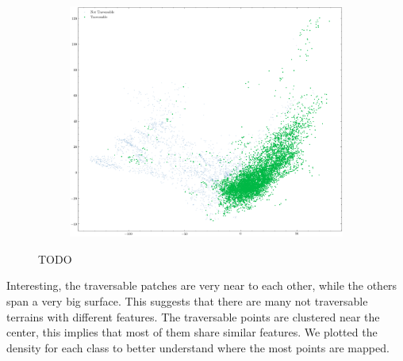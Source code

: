 \documentclass[../document.tex]{subfiles}
\begin{document}
\begin{figure} [htbp]
\begin{subfigure}[b]{0.48\textwidth}
    \end{subfigure}
    \begin{subfigure}[b]{0.48\textwidth}
        \includegraphics[width=\linewidth]{../img/5/pca/pca-test-1.png}
    \end{subfigure}
\caption{TODO}
\end{figure}
Interesting, the traversable patches are very near to each other, while the others span a very big surface. This suggests that there are many not traversable terrains with different features. The traversable points are clustered near the center, this implies that most of them share similar features. We plotted the density for each class to better understand where the most points are mapped.
\end{document}
